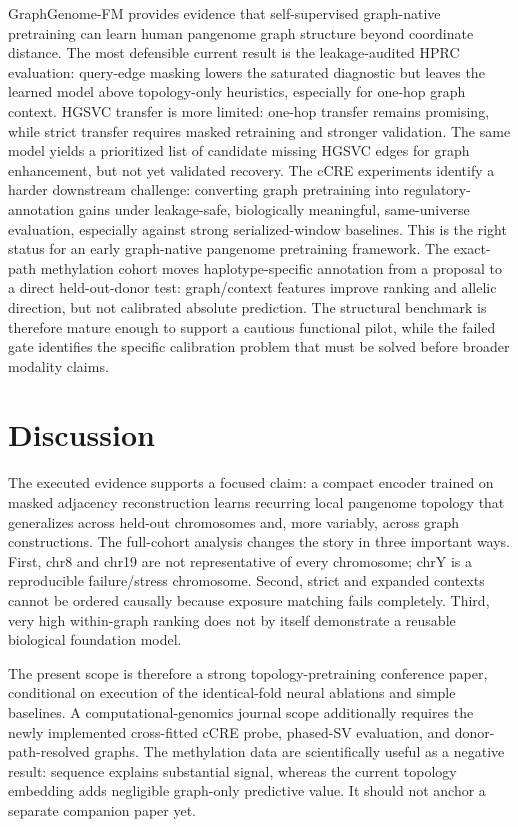 \IfFileExists{ws-procs11x85.cls}{\worldscientificclasstrue\documentclass{ws-procs11x85}}{\worldscientificclassfalse\documentclass[11pt]{article}\usepackage[margin=1in]{geometry}}
\begin{document}
GraphGenome-FM provides evidence that self-supervised graph-native pretraining
can learn human pangenome graph structure beyond coordinate distance. The most
defensible current result is the leakage-audited HPRC evaluation: query-edge
masking lowers the saturated diagnostic but leaves the learned model above
topology-only heuristics, especially for one-hop graph context. HGSVC transfer is
more limited: one-hop transfer remains promising, while strict transfer requires
masked retraining and stronger validation. The same model yields a prioritized
list of candidate missing HGSVC edges for graph enhancement, but not yet
validated recovery. The cCRE experiments identify a harder downstream challenge:
converting graph pretraining into regulatory-annotation gains under leakage-safe,
biologically meaningful, same-universe evaluation, especially against strong
serialized-window baselines. This is the right status for an early graph-native
pangenome pretraining framework. The exact-path methylation cohort moves
haplotype-specific annotation from a proposal to a direct held-out-donor test:
graph/context features improve ranking and allelic direction, but not calibrated
absolute prediction. The structural benchmark is therefore mature enough to
support a cautious functional pilot, while the failed gate identifies the
specific calibration problem that must be solved before broader modality
claims.

\fi

\section{Discussion}

The executed evidence supports a focused claim: a compact encoder trained on
masked adjacency reconstruction learns recurring local pangenome topology that
generalizes across held-out chromosomes and, more variably, across graph
constructions. The full-cohort analysis changes the story in three important
ways. First, chr8 and chr19 are not representative of every chromosome; chrY is
a reproducible failure/stress chromosome. Second, strict and expanded contexts
cannot be ordered causally because exposure matching fails completely. Third,
very high within-graph ranking does not by itself demonstrate a reusable
biological foundation model.

The present scope is therefore a strong topology-pretraining conference paper,
conditional on execution of the identical-fold neural ablations and simple
baselines. A computational-genomics journal scope additionally requires the
newly implemented cross-fitted cCRE probe, phased-SV evaluation, and
donor-path-resolved graphs. The methylation data are scientifically useful as a
negative result: sequence explains substantial signal, whereas the current
topology embedding adds negligible graph-only predictive value. It should not
anchor a separate companion paper yet.
\end{document}
